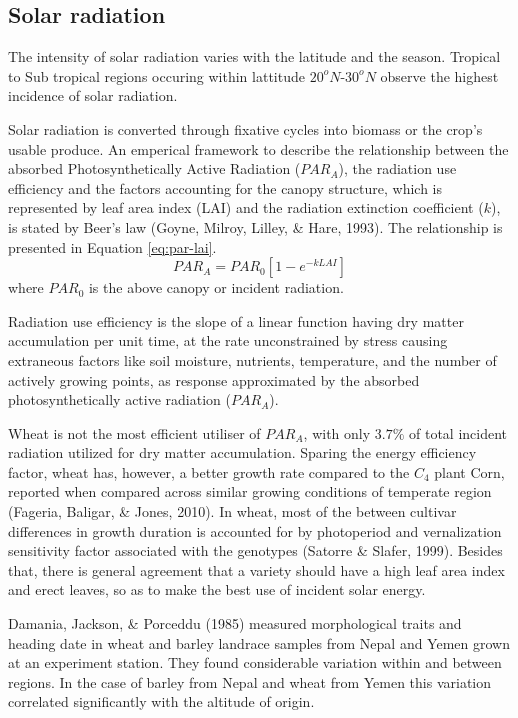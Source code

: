 \documentclass[12pt,oneside]{dukestatscithesis} %
\begin{document}
\hypertarget{solar-radiation}{%
\subsection{Solar radiation}\label{solar-radiation}}

The intensity of solar radiation varies with the latitude and the season. Tropical to Sub tropical regions occuring within lattitude \(20^oN\)-\(30^oN\) observe the highest incidence of solar radiation.

Solar radiation is converted through fixative cycles into biomass or the crop's usable produce. An emperical framework to describe the relationship between the absorbed Photosynthetically Active Radiation (\(PAR_A\)), the radiation use efficiency and the factors accounting for the canopy structure, which is represented by leaf area index (LAI) and the radiation extinction coefficient (\(\textit{k}\)), is stated by Beer's law (Goyne, Milroy, Lilley, \& Hare, 1993). The relationship is presented in Equation \eqref{eq:par-lai}.
\begin{equation}
PAR_A = PAR_0[1-e^{-\textit{k}LAI}]
\label{eq:par-lai}
\end{equation}
where \(PAR_0\) is the above canopy or incident radiation.

Radiation use efficiency is the slope of a linear function having dry matter accumulation per unit time, at the rate unconstrained by stress causing extraneous factors like soil moisture, nutrients, temperature, and the number of actively growing points, as response approximated by the absorbed photosynthetically active radiation (\(PAR_A\)).

Wheat is not the most efficient utiliser of \(PAR_A\), with only \(3.7\%\) of total incident radiation utilized for dry matter accumulation. Sparing the energy efficiency factor, wheat has, however, a better growth rate compared to the \(C_4\) plant Corn, reported when compared across similar growing conditions of temperate region (Fageria, Baligar, \& Jones, 2010). In wheat, most of the between cultivar differences in growth duration is accounted for by photoperiod and vernalization sensitivity factor associated with the genotypes (Satorre \& Slafer, 1999). Besides that, there is general agreement that a variety should have a high leaf area index and erect leaves, so as to make the best use of incident solar energy.

Damania, Jackson, \& Porceddu (1985) measured morphological traits and heading date in wheat and barley landrace samples from Nepal and Yemen grown at an experiment station. They found considerable variation within and between regions. In the case of barley from Nepal and wheat from Yemen this variation correlated significantly with the altitude of origin.
\end{document}

